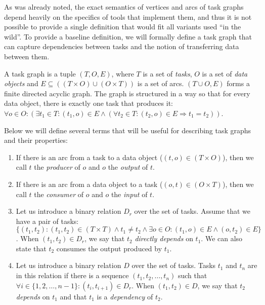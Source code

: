 As was already noted, the exact semantics of vertices and arcs of task graphs depend heavily on the
specifics of tools that implement them, and thus it is not possible to provide a single definition
that would fit all variants used ``in the wild''. To provide a baseline definition, we will
formally define a task graph that can capture dependencies between tasks and the notion of
transferring data between them.

A task graph is a tuple $(T, O, E)$, where $T$ is a set of
\emph{tasks}, $O$ is a set of \emph{data objects} and
$E \subseteq ((T\times{}O) \cup (O\times{}T))$ is a set of arcs. $(T \cup O, E)$ forms a finite directed acyclic
graph. The graph is structured in a way so that for every data object, there is exactly one task
that produces it: $\forall o\in{}O: (\exists t_1\in{}T: (t_1, o) \in E \land
	(\forall
	t_2\in{}T: (t_2, o) \in E \Rightarrow t_1 = t_2))$.

Below we will define several terms that will be useful for describing task graphs and their
properties:
\begin{enumerate}
	\item If there is an arc from a task to a data object ($(t,o) \in (T\times{}O)$), then we call
	      $t$ the \emph{producer} of $o$ and $o$
	      the \emph{output} of $t$.
	\item If there is an arc from a data object to a task ($(o,t) \in (O\times{}T)$), then we call
	      $t$ the \emph{consumer} of $o$ and $o$
	      the \emph{input} of $t$.

	\item Let us introduce a binary relation $D_r$ over the set of tasks. Assume that we
	      have a pair of tasks: $\{(t_1, t_2): (t_1, t_2)\in{}(T\times{}T)\land t_1 \neq t_2 \land
		      \exists{}o\in{}O: (t_1, o)\in{}E
		      \land (o, t_2)\in{}E\}$. When $(t_1, t_2) \in D_r$, we say that
	      $t_2$ \emph{directly depends} on $t_1$. We can also state that
	      $t_2$ consumes the output produced by $t_1$.

	\item Let us introduce a binary relation $D$ over the set of tasks. Tasks
	      $t_1$ and $t_n$ are in this relation if there is a sequence
	      $(t_1, t_2, \ldots, t_n)$ such that $\forall i \in \{
		      1,2,\ldots,n - 1\}: (t_i, t_{i+1}) \in D_r$. When $(t_1, t_2) \in D$, we say that
	      $t_2$ \emph{depends} on $t_1$ and that
	      $t_1$ is a \emph{dependency} of $t_2$.

\end{enumerate}

